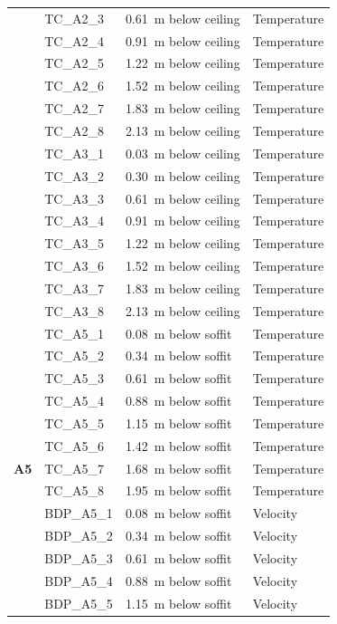 \documentclass[12pt,oneside]{book}
\begin{document}
\begin{longtable}[c]{c|lll}
 & TC\_A2\_3  & 0.61~m below ceiling & Temperature \\
 & TC\_A2\_4  & 0.91~m below ceiling & Temperature \\
 & TC\_A2\_5  & 1.22~m below ceiling & Temperature \\
 & TC\_A2\_6  & 1.52~m below ceiling & Temperature \\
 & TC\_A2\_7  & 1.83~m below ceiling & Temperature \\
 & TC\_A2\_8  & 2.13~m below ceiling & Temperature \\
 \bottomrule
 \newpage
 \multirow{10}{*}{\large{\textbf{A3}}}
 & TC\_A3\_1  & 0.03~m below ceiling & Temperature \\
 & TC\_A3\_2  & 0.30~m below ceiling & Temperature \\
 & TC\_A3\_3  & 0.61~m below ceiling & Temperature \\
 & TC\_A3\_4  & 0.91~m below ceiling & Temperature \\
 & TC\_A3\_5  & 1.22~m below ceiling & Temperature \\
 & TC\_A3\_6  & 1.52~m below ceiling & Temperature \\
 & TC\_A3\_7  & 1.83~m below ceiling & Temperature \\
 & TC\_A3\_8  & 2.13~m below ceiling & Temperature \\
 \midrule
\multirow{16}{*}{\large{\textbf{A5}}}
 & TC\_A5\_1  & 0.08~m below soffit  & Temperature \\
 & TC\_A5\_2  & 0.34~m below soffit  & Temperature \\
 & TC\_A5\_3  & 0.61~m below soffit  & Temperature \\
 & TC\_A5\_4  & 0.88~m below soffit  & Temperature \\
 & TC\_A5\_5  & 1.15~m below soffit  & Temperature \\
 & TC\_A5\_6  & 1.42~m below soffit  & Temperature \\
 & TC\_A5\_7  & 1.68~m below soffit  & Temperature \\
 & TC\_A5\_8  & 1.95~m below soffit  & Temperature \\
\cline{2-4}
 & BDP\_A5\_1 & 0.08~m below soffit  & Velocity \\
 & BDP\_A5\_2 & 0.34~m below soffit  & Velocity \\
 & BDP\_A5\_3 & 0.61~m below soffit  & Velocity \\
 & BDP\_A5\_4 & 0.88~m below soffit  & Velocity \\
 & BDP\_A5\_5 & 1.15~m below soffit  & Velocity \\

\end{longtable}
\end{document}
